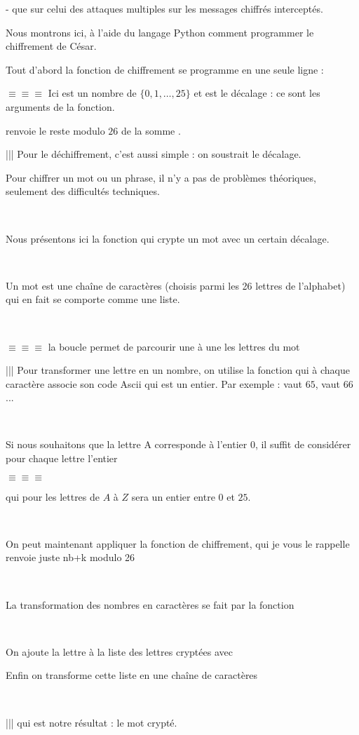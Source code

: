 - que sur celui des attaques multiples sur les messages chiffrés interceptés.

Nous montrons ici, à l'aide du langage Python comment programmer 
le chiffrement de César. 

Tout d'abord la fonction de chiffrement se programme en une seule ligne :

$\equiv \equiv \equiv$ Ici  est un nombre de $\{0,1,\ldots,25\}$ et 
est le décalage : ce sont les arguments de la fonction.

  renvoie le reste modulo $26$ de la somme .

\change

||| Pour le déchiffrement, c'est aussi simple : on soustrait le décalage.




\diapo


Pour chiffrer un mot ou un phrase, il n'y a pas de problèmes théoriques, seulement 
des difficultés techniques.

~

Nous présentons ici la fonction qui crypte un mot avec un certain décalage.

~

Un mot est une chaîne de caractères (choisis parmi les 26 lettres de l'alphabet) qui en fait se comporte comme une liste.

~

$\equiv \equiv \equiv$   la boucle  permet de parcourir une à une les lettres du mot

  
||| Pour transformer une lettre en un nombre, on utilise la fonction  qui à chaque caractère 
  associe son code Ascii qui est un entier. Par exemple :  vaut $65$,  vaut $66$... 
  
~

Si nous souhaitons que la lettre A corresponde à l'entier 0, il suffit de considérer pour chaque lettre l'entier 

$\equiv \equiv \equiv$   

qui pour les lettres de $A$ à $Z$ sera un entier entre $0$ et $25$.

~

On peut maintenant appliquer la fonction de chiffrement, qui je vous le rappelle renvoie juste  nb+k modulo 26
 
~
 
La transformation des nombres en caractères se fait par la fonction 

~
  
On ajoute la lettre à la liste des lettres cryptées avec 
  
Enfin on transforme cette liste en une chaîne de caractères 

~

||| qui est notre résultat : le mot crypté.
 

